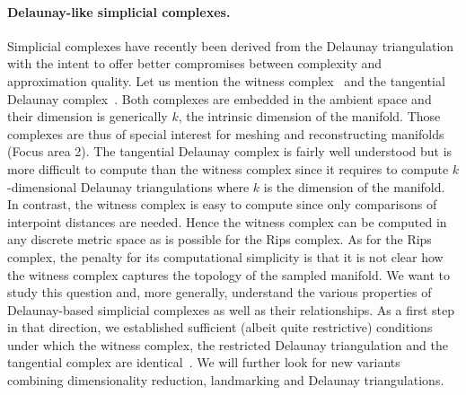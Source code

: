 \paragraph{Delaunay-like  simplicial complexes.} 
Simplicial complexes have recently been derived from the Delaunay triangulation with the intent to offer better compromises between complexity and approximation quality. Let us mention the witness complex~\cite{cds-tewc-2004} and the tangential Delaunay complex~\cite{geometrica-7142i}. Both complexes are embedded in the ambient space and their dimension is generically $k$, the intrinsic dimension of the manifold. Those complexes are thus of special interest for meshing and reconstructing manifolds (Focus area 2).  The tangential Delaunay complex is fairly well understood but is more difficult to compute than the witness complex since it requires to compute $k$-dimensional Delaunay triangulations where $k$ is the dimension of the manifold.  In contrast, the witness complex is easy to compute since only comparisons of interpoint distances are needed. Hence the witness complex can be computed in any discrete metric space as is possible for the Rips complex. 
As for the Rips complex, the penalty for its computational simplicity is that it is not clear how the witness complex captures the topology of the sampled manifold. 
We want to study this question and, more generally, understand the various properties of Delaunay-based simplicial complexes as well as their relationships. As a  first step in that direction, we established sufficient (albeit quite restrictive) conditions under which the witness complex, the restricted Delaunay triangulation and the tangential complex are identical~\cite{boissonnat2012stab}. We will further look for new
variants combining dimensionality reduction, landmarking and Delaunay triangulations.



